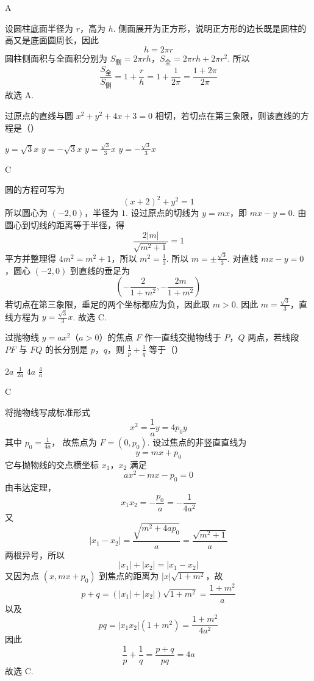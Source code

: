 \begin{answer}
A
\end{answer}

\begin{solution}
设圆柱底面半径为 \(r\)，高为 \(h\). 侧面展开为正方形，说明正方形的边长既是圆柱的高又是底面圆周长，因此
\[
h=2\pi r
\]
圆柱侧面积与全面积分别为 \(S_{\text{侧}}=2\pi rh\)，\(S_{\text{全}}=2\pi rh+2\pi r^2\).
所以
\[
\frac{S_{\text{全}}}{S_{\text{侧}}}
=1+\frac{r}{h}
=1+\frac{1}{2\pi}
=\frac{1+2\pi}{2\pi}
\]
故选 A.
\end{solution}

\begin{problem}
过原点的直线与圆 \(x^{2} + y^{2} + 4x + 3 = 0\) 相切，若切点在第三象限，则该直线的方程是（\quad）

\choices
    {\(y = \sqrt{3} x\)}
    {\(y = -\sqrt{3} x\)}
    {\( y = \frac{\sqrt{3}}{3} x \)}
    {\(y = -\frac{\sqrt{3}}{3} x\)}
\end{problem}

\begin{answer}
C
\end{answer}

\begin{solution}
圆的方程可写为
\[
(x+2)^2+y^2=1
\]
所以圆心为 \((-2,0)\)，半径为 \(1\). 设过原点的切线为 \(y=mx\)，即 \(mx-y=0\). 由圆心到切线的距离等于半径，得
\[
\frac{2\lvert m\rvert}{\sqrt{m^2+1}}=1
\]
平方并整理得 \(4m^2=m^2+1\)，所以 \(m^2=\frac13\).
所以 \(m=\pm\frac{\sqrt3}{3}\). 对直线 \(mx-y=0\)，圆心 \((-2,0)\) 到直线的垂足为
\[
\left(-\frac{2}{1+m^2},-\frac{2m}{1+m^2}\right)
\]
若切点在第三象限，垂足的两个坐标都应为负，因此取 \(m>0\). 因此 \(m=\frac{\sqrt{3}}3\)，直线方程为 \(y=\frac{\sqrt{3}}3x\).
故选 C.
\end{solution}

\begin{problem}
过抛物线 \(y = ax^{2}\)（\(a > 0\)）的焦点 \(F\) 作一直线交抛物线于 \(P\)，\(Q\) 两点，若线段 \(PF\) 与 \(FQ\) 的长分别是 \(p\)，\(q\)，则 \(\frac{1}{p} + \frac{1}{q}\) 等于（\quad）

\choices
    {\(2a\)}
    {\(\frac{1}{2a}\)}
    {\(4a\)}
    {\(\frac{4}{a}\)}
\end{problem}

\begin{answer}
C
\end{answer}

\begin{solution}
将抛物线写成标准形式
\[
x^2=\frac1a y=4p_0y
\]
其中 \(p_0=\frac{1}{4a}\)，
故焦点为 \(F=(0,p_0)\). 设过焦点的非竖直直线为
\[
y=mx+p_0
\]
它与抛物线的交点横坐标 \(x_1\)，\(x_2\) 满足
\[
ax^2-mx-p_0=0
\]
由韦达定理，
\[
x_1x_2=-\frac{p_0}{a}=-\frac{1}{4a^2}
\]
又
\[
|x_1-x_2|=\frac{\sqrt{m^2+4ap_0}}{a}=\frac{\sqrt{m^2+1}}a
\]
两根异号，所以
\[
|x_1|+|x_2|=|x_1-x_2|
\]
又因为点 \((x,mx+p_0)\) 到焦点的距离为 \(\lvert x\rvert\sqrt{1+m^2}\)，故
\[
p+q=(|x_1|+|x_2|)\sqrt{1+m^2}=\frac{1+m^2}{a}
\]
以及
\[
pq=|x_1x_2|(1+m^2)=\frac{1+m^2}{4a^2}
\]
因此
\[
\frac1p+\frac1q=\frac{p+q}{pq}=4a
\]
故选 C.
\end{solution}

